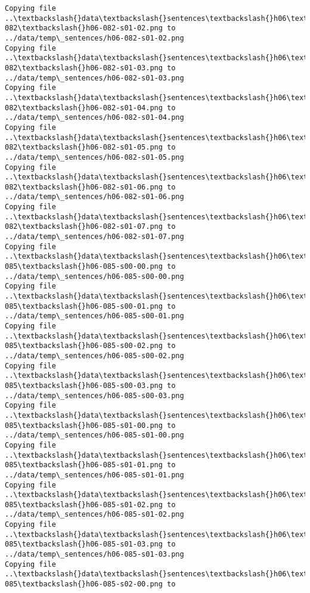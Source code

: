 \documentclass[11pt]{article}
\begin{document}
\begin{Verbatim}[commandchars=\\\{\}]
Copying file ..\textbackslash{}data\textbackslash{}sentences\textbackslash{}h06\textbackslash{}h06-082\textbackslash{}h06-082-s01-02.png to
../data/temp\_sentences/h06-082-s01-02.png
Copying file ..\textbackslash{}data\textbackslash{}sentences\textbackslash{}h06\textbackslash{}h06-082\textbackslash{}h06-082-s01-03.png to
../data/temp\_sentences/h06-082-s01-03.png
Copying file ..\textbackslash{}data\textbackslash{}sentences\textbackslash{}h06\textbackslash{}h06-082\textbackslash{}h06-082-s01-04.png to
../data/temp\_sentences/h06-082-s01-04.png
Copying file ..\textbackslash{}data\textbackslash{}sentences\textbackslash{}h06\textbackslash{}h06-082\textbackslash{}h06-082-s01-05.png to
../data/temp\_sentences/h06-082-s01-05.png
Copying file ..\textbackslash{}data\textbackslash{}sentences\textbackslash{}h06\textbackslash{}h06-082\textbackslash{}h06-082-s01-06.png to
../data/temp\_sentences/h06-082-s01-06.png
Copying file ..\textbackslash{}data\textbackslash{}sentences\textbackslash{}h06\textbackslash{}h06-082\textbackslash{}h06-082-s01-07.png to
../data/temp\_sentences/h06-082-s01-07.png
Copying file ..\textbackslash{}data\textbackslash{}sentences\textbackslash{}h06\textbackslash{}h06-085\textbackslash{}h06-085-s00-00.png to
../data/temp\_sentences/h06-085-s00-00.png
Copying file ..\textbackslash{}data\textbackslash{}sentences\textbackslash{}h06\textbackslash{}h06-085\textbackslash{}h06-085-s00-01.png to
../data/temp\_sentences/h06-085-s00-01.png
Copying file ..\textbackslash{}data\textbackslash{}sentences\textbackslash{}h06\textbackslash{}h06-085\textbackslash{}h06-085-s00-02.png to
../data/temp\_sentences/h06-085-s00-02.png
Copying file ..\textbackslash{}data\textbackslash{}sentences\textbackslash{}h06\textbackslash{}h06-085\textbackslash{}h06-085-s00-03.png to
../data/temp\_sentences/h06-085-s00-03.png
Copying file ..\textbackslash{}data\textbackslash{}sentences\textbackslash{}h06\textbackslash{}h06-085\textbackslash{}h06-085-s01-00.png to
../data/temp\_sentences/h06-085-s01-00.png
Copying file ..\textbackslash{}data\textbackslash{}sentences\textbackslash{}h06\textbackslash{}h06-085\textbackslash{}h06-085-s01-01.png to
../data/temp\_sentences/h06-085-s01-01.png
Copying file ..\textbackslash{}data\textbackslash{}sentences\textbackslash{}h06\textbackslash{}h06-085\textbackslash{}h06-085-s01-02.png to
../data/temp\_sentences/h06-085-s01-02.png
Copying file ..\textbackslash{}data\textbackslash{}sentences\textbackslash{}h06\textbackslash{}h06-085\textbackslash{}h06-085-s01-03.png to
../data/temp\_sentences/h06-085-s01-03.png
Copying file ..\textbackslash{}data\textbackslash{}sentences\textbackslash{}h06\textbackslash{}h06-085\textbackslash{}h06-085-s02-00.png to

\end{Verbatim}
\end{document}
